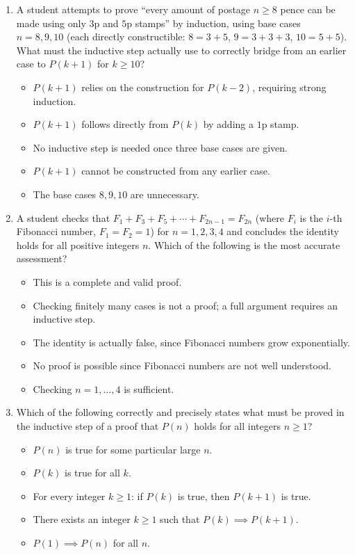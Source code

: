 \documentclass[11pt,a4paper]{article}
\begin{document}
\begin{enumerate}
\item A student attempts to prove ``every amount of postage $n\geq8$ pence can be made using only $3$p and $5$p stamps'' by induction, using base cases $n=8,9,10$ (each directly constructible: $8=3+5$, $9=3+3+3$, $10=5+5$). What must the inductive step actually use to correctly bridge from an earlier case to $P(k+1)$ for $k\geq10$?
\begin{itemize}
\item[A)] $P(k+1)$ relies on the construction for $P(k-2)$, requiring strong induction.
\item[B)] $P(k+1)$ follows directly from $P(k)$ by adding a $1$p stamp.
\item[C)] No inductive step is needed once three base cases are given.
\item[D)] $P(k+1)$ cannot be constructed from any earlier case.
\item[E)] The base cases $8,9,10$ are unnecessary.
\end{itemize}

\item A student checks that $F_1+F_3+F_5+\cdots+F_{2n-1}=F_{2n}$ (where $F_i$ is the $i$-th Fibonacci number, $F_1=F_2=1$) for $n=1,2,3,4$ and concludes the identity holds for all positive integers $n$. Which of the following is the most accurate assessment?
\begin{itemize}
\item[A)] This is a complete and valid proof.
\item[B)] Checking finitely many cases is not a proof; a full argument requires an inductive step.
\item[C)] The identity is actually false, since Fibonacci numbers grow exponentially.
\item[D)] No proof is possible since Fibonacci numbers are not well understood.
\item[E)] Checking $n=1,\dots,4$ is sufficient.
\end{itemize}

\item Which of the following correctly and precisely states what must be proved in the inductive step of a proof that $P(n)$ holds for all integers $n\geq1$?
\begin{itemize}
\item[A)] $P(n)$ is true for some particular large $n$.
\item[B)] $P(k)$ is true for all $k$.
\item[C)] For every integer $k\geq1$: if $P(k)$ is true, then $P(k+1)$ is true.
\item[D)] There exists an integer $k\geq1$ such that $P(k)\implies P(k+1)$.
\item[E)] $P(1)\implies P(n)$ for all $n$.
\end{itemize}

\end{enumerate}
\end{document}
